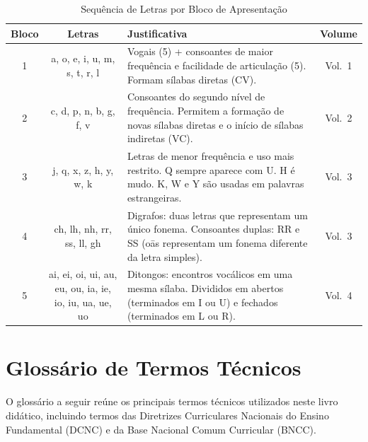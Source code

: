 \begin{table}[h]
\centering
\caption{Sequ\^{e}ncia de Letras por Bloco de Apresenta\c{c}\~{a}o}
\label{tab:sequencia-letras}
\renewcommand{\arraystretch}{1.35}
\begin{tabular}{|c|c|p{5cm}|c|}
\hline
\textbf{Bloco} & \textbf{Letras} & \textbf{Justificativa} & \textbf{Volume} \\
\hline
\rowcolor{warning!15}
1 &
a, o, e, i, u, m, s, t, r, l &
Vogais (5) + consoantes de maior frequ\^{e}ncia e facilidade
de articula\c{c}\~{a}o (5). Formam s\'{i}labas diretas (CV). &
Vol.~1 \\
\hline
\rowcolor{accent!10}
2 &
c, d, p, n, b, g, f, v &
Consoantes do segundo n\'{i}vel de frequ\^{e}ncia. Permitem
a forma\c{c}\~{a}o de novas s\'{i}labas diretas e o in\'{i}cio
de s\'{i}labas indiretas (VC). &
Vol.~2 \\
\hline
\rowcolor{primary!10}
3 &
j, q, x, z, h, y, w, k &
Letras de menor frequ\^{e}ncia e uso mais restrito. Q sempre
aparece com U. H \'{e} mudo. K, W e Y s\~{a}o usadas em
palavras estrangeiras. &
Vol.~3 \\
\hline
\rowcolor{success!10}
4 &
ch, lh, nh, rr, ss, ll, gh &
Digrafos: duas letras que representam um \'{u}nico fonema.
Consoantes duplas: RR e SS (o\={a}s representam um fonema
diferente da letra simples). &
Vol.~3 \\
\hline
5 &
ai, ei, oi, ui, au, eu, ou, ia, ie, io, iu, ua, ue, uo &
Ditongos: encontros voc\'{a}licos em uma mesma s\'{i}laba.
Divididos em abertos (terminados em I ou U) e fechados
(terminados em L ou R). &
Vol.~4 \\
\hline
\end{tabular}
\end{table}


\chapter{Glossário de Termos Técnicos}

O glossário a seguir re\'{u}ne os principais termos t\'{e}cnicos
utilizados neste livro did\'{a}tico, incluindo termos das Diretrizes
Curriculares Nacionais do Ensino Fundamental (DCNC) e da Base
Nacional Comum Curricular (BNCC).

